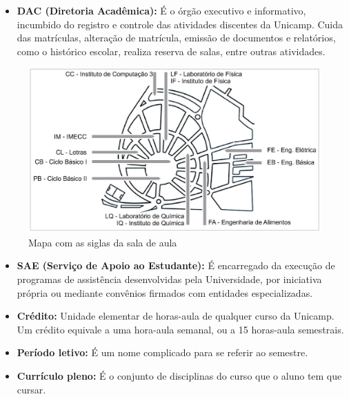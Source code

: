 \begin{itemize}
\item  \textbf{DAC (Diretoria Acadêmica):} É o órgão executivo e informativo, incumbido do registro e controle das atividades discentes da Unicamp. Cuida das matrículas, alteração de matrícula, emissão de documentos e relatórios, como o histórico escolar, realiza reserva de salas, entre outras atividades.
\end{itemize}

\begin{figure}[hb!]
    \includegraphics[scale=0.26, keepaspectratio=true]{img/imgs/10-siglas_malucas/mapa_siglas.jpg}
    \caption{Mapa com as siglas da sala de aula}
    \label{fig:mapa_siglas}
\end{figure}


\begin{itemize}
\item  \textbf{SAE (Serviço de Apoio ao Estudante):} É encarregado da execução de programas de assistência desenvolvidas pela Universidade, por iniciativa própria ou mediante convênios firmados com entidades especializadas.
\end{itemize}

\begin{itemize}
\item  \textbf{Crédito:} Unidade elementar de horas-aula de qualquer curso da Unicamp. Um crédito equivale a uma hora-aula semanal, ou a 15 horas-aula semestrais.
\end{itemize}

\begin{itemize}
\item  \textbf{Período letivo:} É um nome complicado para se referir ao semestre.
\end{itemize}

\begin{itemize}
\item  \textbf{Currículo pleno:} É o conjunto de disciplinas do curso que o aluno tem que cursar.
\end{itemize}

